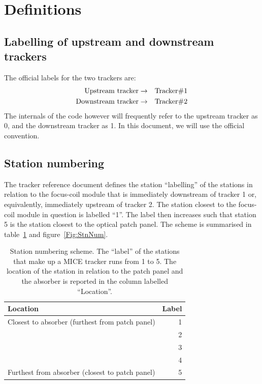 \section{Definitions}
\label{Sect:SciFiDefinitions}

\subsection{Labelling of upstream and downstream trackers}
\label{SubSect:SciFiTkrLabel}

The official labels for the two trackers are: 
\begin{eqnarray}
  {\rm Upstream~tracker}   & \rightarrow & {\rm Tracker \# 1} \nonumber \\
  {\rm Downstream~tracker} & \rightarrow & {\rm Tracker \# 2} \nonumber 
\end{eqnarray}
The internals of the code however will frequently refer to the upstream tracker as 0, and the downstream tracker as 1. In this document, we will use the official convention.

\subsection{Station numbering}
\label{SubSect:SciFiStnNumbering}

The tracker reference document defines the station ``labelling'' of the stations in relation to the focus-coil module that is immediately downstream of tracker 1 or, equivalently, immediately upstream of tracker 2.  The station closest to the focus-coil module in question is labelled  ``1''.  The label then increases such that station 5 is the station
closest to the optical patch panel. The scheme is summarised in table~\ref{Tab:StnNum} and figure~\ref{Fig:StnNum}.

\begin{table}[hb]
  \caption{Station numbering scheme. The ``label'' of the stations that make up a MICE tracker runs from 1 to 5. The location of the station in relation to the patch panel and the absorber is reported in the column labelled ``Location''.}
  \label{Tab:StnNum}
  \begin{tabular}{|l|r|}
    \hline
    {\bf Location}                                  & {\bf Label} \\
    \hline
    Closest to absorber (furthest from patch panel) &           1 \\
                                                    &           2 \\ 
                                                    &           3 \\
                                                    &           4 \\
    Furthest from absorber (closest to patch panel) &           5 \\
    \hline
  \end{tabular}
\end{table}

